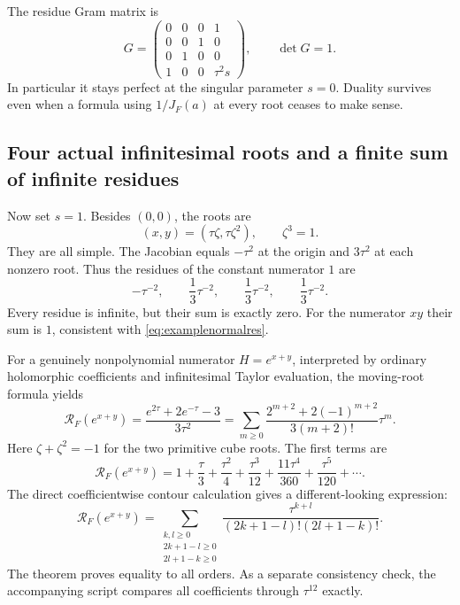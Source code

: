 \documentclass[11pt,letterpaper]{article}
\theoremstyle{definition}
\theoremstyle{remark}
\newcommand{\RR}{\mathscr R}
\numberwithin{equation}{section}
\begin{document}
The residue Gram matrix is
\begin{equation}\label{eq:examplegram}
 G=\begin{pmatrix}
 0&0&0&1\\0&0&1&0\\0&1&0&0\\1&0&0&\tau^2s
 \end{pmatrix},\qquad \det G=1.
\end{equation}
In particular it stays perfect at the singular parameter $s=0$. Duality survives even when a formula using $1/J_F(a)$ at every root ceases to make sense.

\subsection{Four actual infinitesimal roots and a finite sum of infinite residues}
Now set $s=1$. Besides $(0,0)$, the roots are
\begin{equation}\label{eq:exampleroots}
 (x,y)=(\tau\zeta,\tau\zeta^2),\qquad \zeta^3=1.
\end{equation}
They are all simple. The Jacobian equals $-\tau^2$ at the origin and $3\tau^2$ at each nonzero root. Thus the residues of the constant numerator $1$ are
\[
 -\tau^{-2},\qquad \frac1{3}\tau^{-2},\qquad
 \frac1{3}\tau^{-2},\qquad \frac1{3}\tau^{-2}.
\]
Every residue is infinite, but their sum is exactly zero. For the numerator $xy$ their sum is $1$, consistent with \eqref{eq:examplenormalres}.

For a genuinely nonpolynomial numerator $H=e^{x+y}$, interpreted by ordinary holomorphic coefficients and infinitesimal Taylor evaluation, the moving-root formula yields
\begin{equation}\label{eq:exponentialres}
 \RR_F(e^{x+y})
 =\frac{e^{2\tau}+2e^{-\tau}-3}{3\tau^2}
 =\sum_{m\ge0}\frac{2^{m+2}+2(-1)^{m+2}}{3(m+2)!}\tau^m.
\end{equation}
Here $\zeta+\zeta^2=-1$ for the two primitive cube roots. The first terms are
\[
 \RR_F(e^{x+y})
 =1+\frac\tau3+\frac{\tau^2}{4}+\frac{\tau^3}{12}
   +\frac{11\tau^4}{360}+\frac{\tau^5}{120}+\cdots.
\]
The direct coefficientwise contour calculation gives a different-looking expression:
\begin{equation}\label{eq:doubleres}
 \RR_F(e^{x+y})
 =\sum_{\substack{k,l\ge0\\2k+1-l\ge0\\2l+1-k\ge0}}
  \frac{\tau^{k+l}}{(2k+1-l)!(2l+1-k)!}.
\end{equation}
The theorem proves equality to all orders. As a separate consistency check, the accompanying script compares all coefficients through $\tau^{12}$ exactly.
\end{document}
